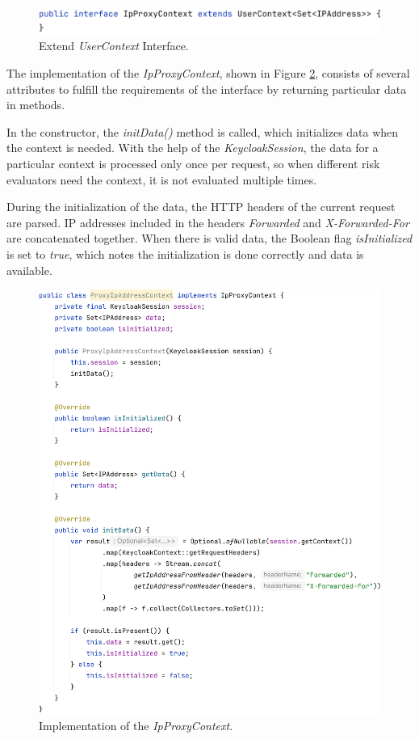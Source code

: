 \begin{figure}[htbp]
  \centering
  \includegraphics[width=1\textwidth]{img/sections/6-implementation/proxyIpAddressContextInterface.png}
  \caption{Extend \textit{UserContext} Interface.}
  \label{fig:impl-user-ctx-ifc}
\end{figure}

The implementation of the \textit{IpProxyContext}, shown in Figure \ref{fig:impl-user-ctx-ip}, consists of several attributes to fulfill the requirements of the interface by returning particular data in methods.

In the constructor, the \textit{initData()} method is called, which initializes data when the context is needed.
With the help of the \textit{KeycloakSession}, the data for a particular context is processed only once per request, so when different risk evaluators need the context, it is not evaluated multiple times.

During the initialization of the data, the HTTP headers of the current request are parsed.
IP addresses included in the headers \textit{Forwarded} and \textit{X-Forwarded-For} are concatenated together.
When there is valid data, the Boolean flag \textit{isInitialized} is set to \textit{true}, which notes the initialization is done correctly and data is available. 

\begin{figure}[htbp]
  \centering
  \includegraphics[width=1\textwidth]{img/sections/6-implementation/proxyIpAddress-full.png}
  \caption{Implementation of the \textit{IpProxyContext}.}
  \label{fig:impl-user-ctx-ip}
\end{figure}

